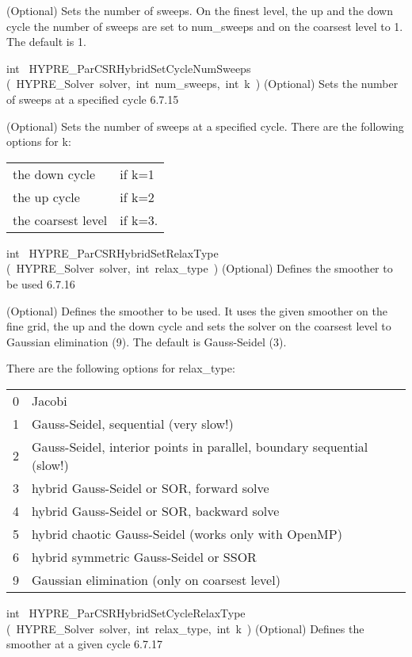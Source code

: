 \documentclass{article}
\begin{document}
\begin{cxxentry}
\begin{cxxentry}
\begin{cxxfunction}
\begin{cxxdoc}
(Optional) Sets the number of sweeps. On the finest level, the up and
the down cycle the number of sweeps are set to num\_sweeps and on the
coarsest level to 1. The default is 1.
\end{cxxdoc}
\end{cxxfunction}
\begin{cxxfunction}
{int\ }
        {HYPRE\_ParCSRHybridSetCycleNumSweeps}
        {(\ HYPRE\_Solver\ solver,\ int\ num\_sweeps,\ int\ k\ )}
        {
(Optional) Sets the number of sweeps at a specified cycle}
        {6.7.15}
\begin{cxxdoc}

(Optional) Sets the number of sweeps at a specified cycle.
There are the following options for k:

\begin{tabular}{|l|l|} \hline
the down cycle &     if k=1 \\
the up cycle &       if k=2 \\
the coarsest level &  if k=3.\\
\hline
\end{tabular}
\end{cxxdoc}
\end{cxxfunction}
\begin{cxxfunction}
{int\ }
        {HYPRE\_ParCSRHybridSetRelaxType}
        {(\ HYPRE\_Solver\ solver,\ int\ relax\_type\ )}
        {
(Optional) Defines the smoother to be used}
        {6.7.16}
\begin{cxxdoc}

(Optional) Defines the smoother to be used. It uses the given
smoother on the fine grid, the up and
the down cycle and sets the solver on the coarsest level to Gaussian
elimination (9). The default is Gauss-Seidel (3).

There are the following options for relax\_type:

\begin{tabular}{|c|l|} \hline
0 &  Jacobi \\
1 &  Gauss-Seidel, sequential (very slow!) \\
2 &  Gauss-Seidel, interior points in parallel, boundary sequential (slow!) \\
3 &  hybrid Gauss-Seidel or SOR, forward solve \\
4 &  hybrid Gauss-Seidel or SOR, backward solve \\
5 &  hybrid chaotic Gauss-Seidel (works only with OpenMP) \\
6 &  hybrid symmetric Gauss-Seidel or SSOR \\
9 &  Gaussian elimination (only on coarsest level) \\
\hline
\end{tabular}
\end{cxxdoc}
\end{cxxfunction}
\begin{cxxfunction}
{int\ }
        {HYPRE\_ParCSRHybridSetCycleRelaxType}
        {(\ HYPRE\_Solver\ solver,\ int\ relax\_type,\ int\ k\ )}
        {
(Optional) Defines the smoother at a given cycle}
        {6.7.17}
\begin{cxxdoc}


\end{cxxdoc}
\end{cxxfunction}
\end{cxxentry}
\end{cxxentry}
\end{document}
